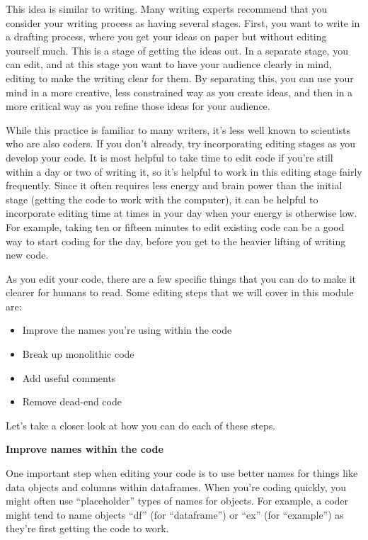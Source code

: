 \documentclass[]{tufte-book}
\providecommand{\tightlist}{%
  \setlength{\itemsep}{0pt}\setlength{\parskip}{0pt}}
\begin{document}
This idea is similar to writing. Many writing experts recommend that you consider
your writing process as having several stages. First, you want to write in a
drafting process, where you get your ideas on paper but without editing yourself
much. This is a stage of getting the ideas out. In a separate stage, you can
edit, and at this stage you want to have your audience clearly in mind, editing
to make the writing clear for them. By separating this, you can use your mind
in a more creative, less constrained way as you create ideas, and then in a
more critical way as you refine those ideas for your audience.

While this practice is familiar to many writers, it's less well known to
scientists who are also coders. If you don't already, try incorporating editing
stages as you develop your code. It is most helpful to take time to edit code if
you're still within a day or two of writing it, so it's helpful to work in this
editing stage fairly frequently. Since it often requires less energy and brain
power than the initial stage (getting the code to work with the computer), it
can be helpful to incorporate editing time at times in your day when your energy
is otherwise low. For example, taking ten or fifteen minutes to edit existing
code can be a good way to start coding for the day, before you get to the
heavier lifting of writing new code.

As you edit your code, there are a few specific things that you can do to make
it clearer for humans to read. Some editing steps that we will cover in this
module are:

\begin{itemize}
\tightlist
\item
  Improve the names you're using within the code
\item
  Break up monolithic code
\item
  Add useful comments
\item
  Remove dead-end code
\end{itemize}

Let's take a closer look at how you can do each of these steps.

\textbf{Improve names within the code}

One important step when editing your code is to use better names for things like
data objects and columns within dataframes. When you're coding quickly, you
might often use ``placeholder'' types of names for objects. For example, a coder
might tend to name objects ``df'' (for ``dataframe'') or ``ex'' (for ``example'') as
they're first getting the code to work.
\end{document}
